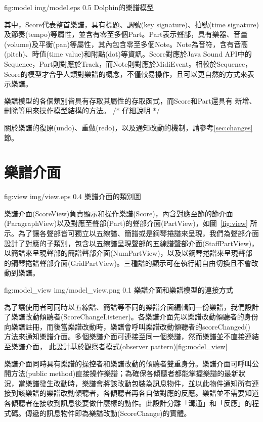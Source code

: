 \documentclass[12pt,a4paper,oneside]{report}
\begin{document}
\figurewithcaption
{fig:model}
{img/model.eps}
{0.5}
{Dolphin的樂譜模型}

其中，Score代表整首樂譜，具有標題、調號(key signature)、拍號(time signature)及節奏(tempo)等屬性，並含有零至多個Part。Part表示聲部，具有樂器、音量(volume)及平衡(pan)等屬性，其內包含零至多個Note。Note為音符，含有音高(pitch)、時值(time value)和附點(dot)等資訊。Score對應於Java Sound API中的Sequence，Part則對應於Track，而Note則對應於MidiEvent。相較於Sequence，Score的模型才合乎人類對樂譜的概念，不僅較易操作，且可以更自然的方式來表示樂譜。

樂譜模型的各個類別皆具有存取其屬性的存取函式，而Score和Part還具有
新增、刪除等用來操作模型結構的方法。 /*  
仔細說明  
*/

關於樂譜的復原(undo)、重做(redo)，以及通知改動的機制，請參考\ref{sec:changes} 節。


\section{樂譜介面}


\figurewithcaption
{fig:view}
{img/view.eps}
{0.4}
{樂譜介面的類別圖}

樂譜介面(ScoreView)負責顯示和操作樂譜(Score)，內含對應至節的節介面(ParagraphView)以及對應至聲部(Part)的聲部介面(PartView)，如圖~\ref{fig:view} 所示。為了讓各聲部皆可獨立以五線譜、簡譜或是鋼琴捲譜來呈現，我們為聲部介面設計了對應的子類別，包含以五線譜呈現聲部的五線譜聲部介面(StaffPartView)，以簡譜來呈現聲部的簡譜聲部介面(NumPartView)，以及以鋼琴捲譜來呈現聲部的鋼琴捲譜聲部介面(GridPartView)。三種譜的顯示可在執行期自由切換且不會改動到樂譜。

\figurewithcaption
{fig:model_view}
{img/model_view.png}
{0.1}
{樂譜介面和樂譜模型的連接方式}

為了讓使用者可同時以五線譜、簡譜等不同的樂譜介面編輯同一份樂譜，我們設計了樂譜改動傾聽者(ScoreChangeListener)。各樂譜介面先以樂譜改動傾聽者的身份向樂譜註冊，而後當樂譜改動時，樂譜會呼叫樂譜改動傾聽者的scoreChanged() 方法來通知樂譜介面。多個樂譜介面可連接至同一個樂譜，然而樂譜並不直接連結至樂譜介面，
此設計基於觀察者模式(observer pattern)\cite{designPatterns}\ref{fig:model_view}

樂譜介面同時具有樂譜的操控者和樂譜改動的傾聽者雙重身分。樂譜介面可呼叫公開方法(public method)直接操作樂譜；為確保各傾聽者都能掌握樂譜的最新狀況，當樂譜發生改動時，樂譜會將該改動包裝為訊息物件，並以此物件通知所有連接到該樂譜的樂譜改動傾聽者，各傾聽者再各自做對應的反應。樂譜並不需要知道各傾聽者在接收到訊息後要做什麼樣的動作。此設計分離「溝通」和「反應」的程式碼。傳遞的訊息物件即為樂譜改動(ScoreChange)的實體。
\end{document}
